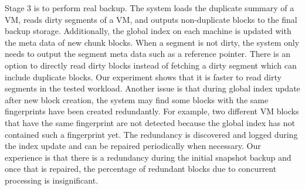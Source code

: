 Stage 3 is to perform real backup.
The system loads the duplicate summary of a VM,
reads  dirty segments of a VM, and outputs non-duplicate blocks to the final backup
storage. Additionally, the global index on each machine is updated with the meta data of new chunk blocks.
When a segment is not dirty, the system only needs to output the segment meta data such as a reference pointer.
There is an option to directly read dirty blocks instead of fetching a dirty segment which can include duplicate
blocks. Our experiment shows that it is faster to read dirty segments in the tested workload.
Another issue is that during global index update after new block creation,
the system  may find some  blocks with the same fingerprints have been
created redundantly. For example, two different VM blocks that have the same  fingerprint are not detected
because  the  global index has not contained such a fingerprint yet.
The redundancy is discovered and logged during the index update and can be repaired
periodically when necessary.  Our experience is that there is a redundancy during the initial snapshot backup and once
that is repaired, the percentage of redundant blocks due to concurrent processing  is insignificant.




